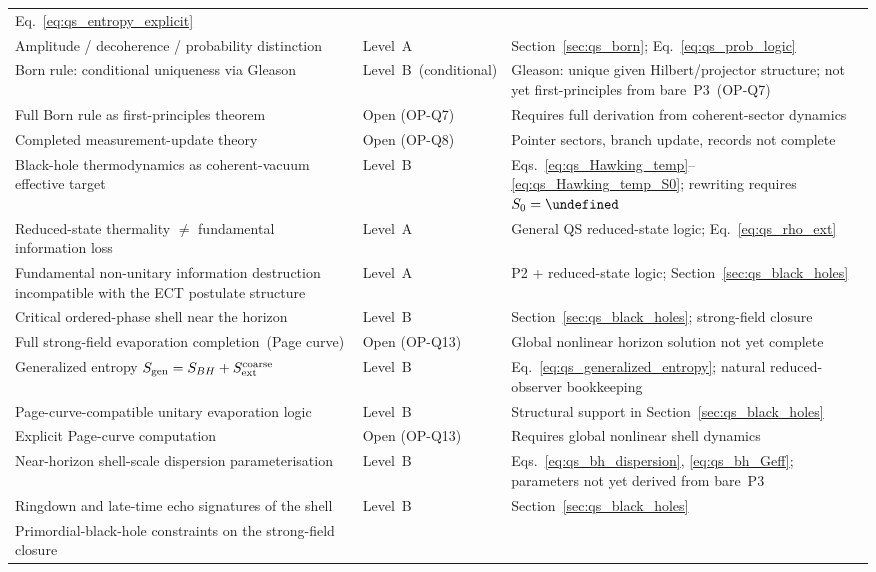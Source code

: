 \documentclass[11pt,a4paper]{article}
\let\hbar\undefined
\numberwithin{equation}{section}
\begin{document}
{\begin{longtable}{p{6.0cm}p{2.4cm}p{4.5cm}}
    Eq.~\eqref{eq:qs_entropy_explicit} \\
Amplitude / decoherence / probability distinction
  & Level~A
  & Section~\ref{sec:qs_born};
    Eq.~\eqref{eq:qs_prob_logic} \\
Born rule: conditional uniqueness via Gleason
  & Level~B~(conditional)
  & Gleason: unique given Hilbert/projector structure;
    not yet first-principles from bare~P3~(OP-Q7) \\
Full Born rule as first-principles theorem
  & Open (OP-Q7)
  & Requires full derivation from coherent-sector dynamics \\
Completed measurement-update theory
  & Open (OP-Q8)
  & Pointer sectors, branch update, records not complete \\
Black-hole thermodynamics as coherent-vacuum effective target
  & Level~B
  & Eqs.~\eqref{eq:qs_Hawking_temp}--\eqref{eq:qs_Hawking_temp_S0};
    rewriting requires $S_0=\hbar$ \\
Reduced-state thermality $\neq$ fundamental information loss
  & Level~A
  & General QS reduced-state logic;
    Eq.~\eqref{eq:qs_rho_ext} \\
Fundamental non-unitary information destruction incompatible
  with the ECT postulate structure
  & Level~A
  & P2 + reduced-state logic; Section~\ref{sec:qs_black_holes} \\
Critical ordered-phase shell near the horizon
  & Level~B
  & Section~\ref{sec:qs_black_holes}; strong-field closure \\
Full strong-field evaporation completion~(Page curve)
  & Open (OP-Q13)
  & Global nonlinear horizon solution not yet complete \\
Generalized entropy $S_{\rm gen}=S_{BH}+S_{\rm ext}^{\rm coarse}$
  & Level~B
  & Eq.~\eqref{eq:qs_generalized_entropy};
    natural reduced-observer bookkeeping \\
Page-curve-compatible unitary evaporation logic
  & Level~B
  & Structural support in Section~\ref{sec:qs_black_holes} \\
Explicit Page-curve computation
  & Open (OP-Q13)
  & Requires global nonlinear shell dynamics \\
Near-horizon shell-scale dispersion parameterisation
  & Level~B
  & Eqs.~\eqref{eq:qs_bh_dispersion},
    \eqref{eq:qs_bh_Geff};
    parameters not yet derived from bare~P3 \\
Ringdown and late-time echo signatures of the shell
  & Level~B
  & Section~\ref{sec:qs_black_holes} \\
Primordial-black-hole constraints on the strong-field closure

\end{longtable}}
\end{document}

